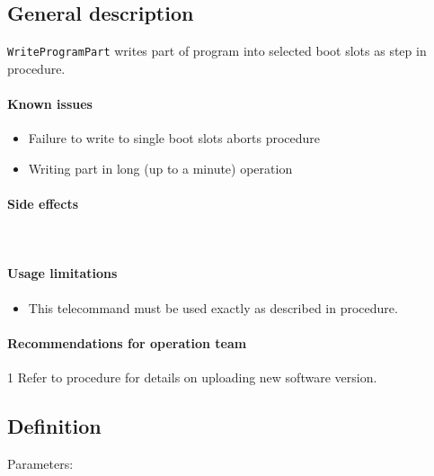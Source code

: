 

\subsection{General description}
\texttt{WriteProgramPart} writes part of program into selected boot slots as step in  procedure.


\paragraph{Known issues}
\begin{itemize}
	\item Failure to write to single boot slots aborts procedure
	\item Writing part in long (up to a minute) operation
\end{itemize}

\paragraph{Side effects}\mbox{}\\ 
\None

\paragraph{Usage limitations}
\begin{itemize}
	\item This telecommand must be used exactly as described in  procedure.
\end{itemize}

\paragraph{Recommendations for operation team}1
Refer to  procedure for details on uploading new software version.


\subsection{Definition}

Parameters: 

\begin{tcarglist}
\end{tcarglist}


